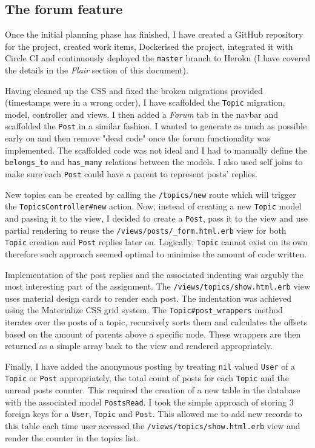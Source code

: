 \documentclass[a4paper, 11pt, titlepage]{article}
\begin{document}
\subsection{The forum feature}
Once the initial planning phase has finished, I have created a GitHub repository for the project,
created work items, Dockerised the project, integrated it with Circle CI and continuously deployed the \texttt{master}
branch to Heroku (I have covered the details in the \textit{Flair} section of this document).

Having cleaned up the CSS and fixed the broken migrations provided (timestamps were in a wrong order),
I have scaffolded the \texttt{Topic} migration, model, controller and views. I then added a
\textit{Forum} tab in the navbar and scaffolded the \texttt{Post} in a similar fashion. I wanted
to generate as much as possible early on and then remove "dead code" once the forum functionality
was implemented. The scaffolded code was not ideal and I had to manually define the \texttt{belongs\_to}
and \texttt{has\_many} relations between the models. I also used self joins to make sure each \texttt{Post}
could have a parent to represent posts' replies.

New topics can be created by calling the \texttt{/topics/new} route which will trigger the \texttt{TopicsController\#new}
action. Now, instead of creating a new \texttt{Topic} model and passing it to the view, I decided to create
a \texttt{Post}, pass it to the view and use partial rendering to reuse the \texttt{/views/posts/\_form.html.erb}
view for both \texttt{Topic} creation and \texttt{Post} replies later on. Logically, \texttt{Topic} cannot exist on its own
therefore such approach seemed optimal to minimise the amount of code written.

Implementation of the post replies and the associated indenting was argubly the most interesting
part of the assignment. The \texttt{/views/topics/show.html.erb} view uses material design cards to
render each post. The indentation was achieved using the Materialize CSS\cite{1} grid system.
The \texttt{Topic\#post\_wrappers} method iterates over the posts of a topic, recursively sorts
them and calculates the offsets based on the amount of parents above a specific node. These wrappers
are then returned as a simple array back to the view and rendered appropriately.

Finally, I have added the anonymous posting by treating \texttt{nil} valued \texttt{User} of a \texttt{Topic} or \texttt{Post}
appropriately, the total count of posts for each \texttt{Topic} and the unread posts counter. This required the creation of a new
table in the database with the associated model \texttt{PostsRead}. I took the simple approach of storing 3 foreign keys
for a \texttt{User}, \texttt{Topic} and \texttt{Post}. This allowed me to add new records to this table each time user
accessed the \texttt{/views/topics/show.html.erb} view and render the counter in the topics list.
\end{document}
